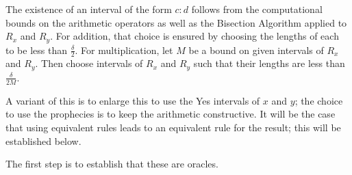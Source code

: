 \documentclass[12pt]{article}
\begin{document}
The existence of an interval of the form $c:d$ follows from the computational bounds on the arithmetic operators as well as the Bisection Algorithm applied to $R_x$ and $R_y$. For addition, that choice is ensured by choosing the lengths of each to be less than $\frac{\delta}{2}$. For multiplication, let $M$ be a bound on given intervals of $R_x$ and $R_y$. Then choose intervals of $R_x$ and $R_y$ such that their lengths are less than $\frac{\delta}{2M}$. 

 A variant of this is to enlarge this to use the Yes intervals of $x$ and $y$; the choice to use the prophecies is to keep the arithmetic constructive. It will be the case that using equivalent rules leads to an equivalent rule for the result; this will be established below. 

The first step is to establish that these are oracles. 
\end{document}
